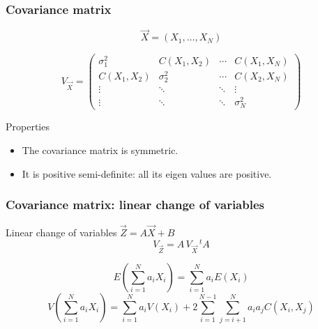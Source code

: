 \documentclass[9pt]{beamer}
\newif\ifmynote
\newcommand\mynote[1]{%
\ifmynote \textbf{#1} \else \fi
}
\begin{document}
\begin{frame}
 \frametitle{Covariance matrix}
 
 \mynote{Écrire au tableau}
 
 \begin{block}{}
  $$\vec{X} = (X_1, \dots, X_N)$$
  
  $$V_{\vec{X}} = \begin{pmatrix}
                   \sigma_1^2 & C(X_1,X_2) & \cdots & C(X_1,X_N) \\
                   C(X_1,X_2) & \sigma_2^2 & \cdots & C(X_2,X_N) \\
                   \vdots & \ddots & \ddots &  \vdots \\
                   \vdots & \ddots & \ddots &  \sigma_N^2
                   \end{pmatrix}
$$
 \end{block}
 
 \begin{block}{Properties}
 
  \begin{itemize}
   \item The covariance matrix is symmetric.
   \item It is positive semi-definite: all its eigen values are positive.
  \end{itemize}

 \end{block}

\end{frame}

\begin{frame}
 \frametitle{Covariance matrix: linear change of variables}
 
 \mynote{Écrire au tableau}
 
 \begin{block}{Linear change of variables $\vec{Z} = A \vec{X} + B$}
  $$V_{\vec{Z}} = A\, V_{\vec{X}}\, ^t A$$
 \end{block}
 
 \begin{block}{}
  $$E \left( \sum_{i=1}^{N} a_i X_i \right) = \sum_{i=1}^{N} a_i E(X_i)$$
  $$V \left( \sum_{i=1}^{N} a_i X_i \right) = \sum_{i=1}^{N} a_i V(X_i) + 2 \sum_{i=1}^{N-1} \sum_{j=i+1}^{N} a_i a_j C(X_i,X_j)$$
 \end{block}
 
 \end{frame}
 
\end{document}
